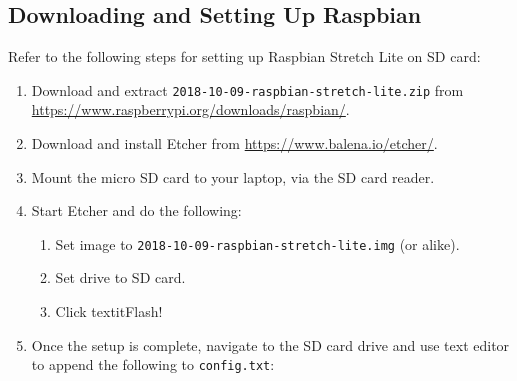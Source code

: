 \documentclass[onecolumn, oneside, letterpaper, draftclsnofoot, 10pt]{IEEEtran}
\begin{document}
\subsection{Downloading and Setting Up Raspbian}
Refer to the following steps for setting up Raspbian Stretch Lite on SD card:
\begin{enumerate}
\item Download and extract \texttt{2018-10-09-raspbian-stretch-lite.zip} from \url{https://www.raspberrypi.org/downloads/raspbian/}.
\item Download and install Etcher from \url{https://www.balena.io/etcher/}.
\item Mount the micro SD card to your laptop, via the SD card reader.
\item Start Etcher and do the following:
    \begin{enumerate}
    \item Set image to \texttt{2018-10-09-raspbian-stretch-lite.img} (or alike).
    \item Set drive to SD card.
    \item Click textit{Flash!}
    \end{enumerate}
\item Once the setup is complete, navigate to the SD card drive and use text editor to append the following to \texttt{config.txt}:
\inputminted[breaklines]{bash}{cs2.sh}
\end{enumerate}
\end{document}
